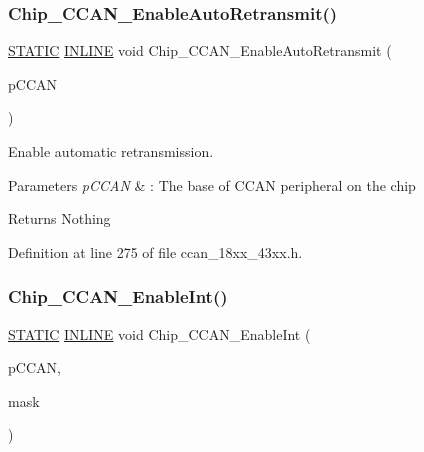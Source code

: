 \subsubsection{\texorpdfstring{Chip\+\_\+\+C\+C\+A\+N\+\_\+\+Enable\+Auto\+Retransmit()}{Chip\_CCAN\_EnableAutoRetransmit()}}
{\footnotesize\ttfamily \hyperlink{group___l_p_c___types___public___macros_ga10b2d890d871e1489bb02b7e70d9bdfb}{S\+T\+A\+T\+IC} \hyperlink{spifi__18xx__43xx_8h_a2eb6f9e0395b47b8d5e3eeae4fe0c116}{I\+N\+L\+I\+NE} void Chip\+\_\+\+C\+C\+A\+N\+\_\+\+Enable\+Auto\+Retransmit (\begin{DoxyParamCaption}\item[{\hyperlink{struct_l_p_c___c_c_a_n___t}{L\+P\+C\+\_\+\+C\+C\+A\+N\+\_\+T} $\ast$}]{p\+C\+C\+AN }\end{DoxyParamCaption})}



Enable automatic retransmission. 


\begin{DoxyParams}{Parameters}
{\em p\+C\+C\+AN} & \+: The base of C\+C\+AN peripheral on the chip \\
\hline
\end{DoxyParams}
\begin{DoxyReturn}{Returns}
Nothing 
\end{DoxyReturn}


Definition at line 275 of file ccan\+\_\+18xx\+\_\+43xx.\+h.

\mbox{\label{group___c_c_a_n__18_x_x__43_x_x_ga06bb34ff1e211fa5153a7f699b9ba599}} 
\subsubsection{\texorpdfstring{Chip\+\_\+\+C\+C\+A\+N\+\_\+\+Enable\+Int()}{Chip\_CCAN\_EnableInt()}}
{\footnotesize\ttfamily \hyperlink{group___l_p_c___types___public___macros_ga10b2d890d871e1489bb02b7e70d9bdfb}{S\+T\+A\+T\+IC} \hyperlink{spifi__18xx__43xx_8h_a2eb6f9e0395b47b8d5e3eeae4fe0c116}{I\+N\+L\+I\+NE} void Chip\+\_\+\+C\+C\+A\+N\+\_\+\+Enable\+Int (\begin{DoxyParamCaption}\item[{\hyperlink{struct_l_p_c___c_c_a_n___t}{L\+P\+C\+\_\+\+C\+C\+A\+N\+\_\+T} $\ast$}]{p\+C\+C\+AN,  }\item[{uint32\+\_\+t}]{mask }\end{DoxyParamCaption})}



